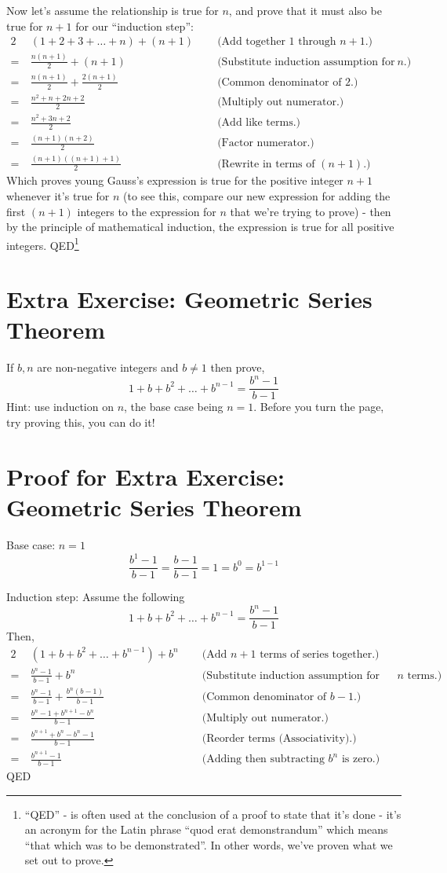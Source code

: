 \documentclass{article}
\begin{document}
\break
Now let's assume the relationship is true for $n$,
and prove that it must also be true for $n+1$ for our ``induction step'':
\begin{alignat*}{2}
&(1+2+3+\ldots+n) + (n+1) \;\;  &&\text{(Add together 1 through }n+1\text{.)}\\
=\ &\frac{n(n+1)}{2} + (n+1) &&\text{(Substitute induction assumption for 1 through }n\text{.)}\\
=\ &\frac{n(n+1)}{2} + \frac{2(n+1)}{2} &&\text{(Common denominator of 2.)}\\
=\ &\frac{n^2+n+2n+2}{2} &&\text{(Multiply out numerator.)}\\
=\ &\frac{n^2+3n+2}{2} &&\text{(Add like terms.)}\\
=\ &\frac{(n+1)(n+2)}{2} &&\text{(Factor numerator.)}\\
=\ &\frac{(n+1)((n+1)+1)}{2} &&\text{(Rewrite in terms of }(n+1)\text{.)}
\end{alignat*}
Which proves young Gauss's expression is true for
the positive integer $n+1$ whenever it's true for $n$ (to see this, compare
our new expression for adding the first $(n+1)$ integers
to the expression for $n$ that we're trying to prove) - then
by the principle of mathematical induction,
the expression is true for all positive integers. QED\footnote{``QED'' - is
often used at the conclusion of a proof to state that it's
done - it's an acronym for the Latin phrase
``quod erat demonstrandum'' which means ``that which was to be demonstrated''.
In other words, we've proven what we set out to prove.}

\section*{Extra Exercise: Geometric Series Theorem}
If $b, n$ are non-negative integers and $b\ne1$ then prove,
\[1+b+b^2+\dots+b^{n-1} = \frac{b^n-1}{b-1}\]
Hint: use induction on $n$, the base case being $n=1$.  Before you turn the page, try proving this, you can do it!

\break
\section*{Proof for Extra Exercise: Geometric Series Theorem}
Base case: $n=1$
\[\frac{b^1-1}{b-1}=\frac{b-1}{b-1}=1=b^0=b^{1-1}\]

Induction step:
Assume the following
\[1+b+b^2+\dots+b^{n-1} = \frac{b^n-1}{b-1}\]
Then,
\begin{alignat*}{2}
&(1+b+b^2+\dots+b^{n-1}) + b^n  \;\;  &&\text{(Add }n+1\text{ terms of series together.)}\\
=\ &\frac{b^n-1}{b-1}+b^n &&\text{(Substitute induction assumption for first }n\text{ terms.)}\\
=\ &\frac{b^n-1}{b-1}+\frac{b^n(b-1)}{b-1}  &&\text{(Common denominator of }b-1\text{.)}\\
=\ &\frac{b^n-1+b^{n+1}-b^n}{b-1} &&\text{(Multiply out numerator.)}\\
=\ &\frac{b^{n+1}+b^n-b^n-1}{b-1} &&\text{(Reorder terms (Associativity).)}\\
=\ &\frac{b^{n+1}-1}{b-1} &&\text{(Adding then subtracting }b^n\text{ is zero.)}
\end{alignat*}
QED
\end{document}
